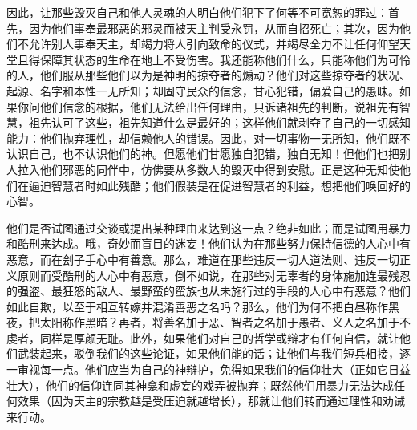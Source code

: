 因此，让那些毁灭自己和他人灵魂的人明白他们犯下了何等不可宽恕的罪过：首先，因为他们事奉最邪恶的邪灵而被天主判受永罚，从而自招死亡；其次，因为他们不允许别人事奉天主，却竭力将人引向致命的仪式，并竭尽全力不让任何仰望天堂且得保障其状态的生命在地上不受伤害。我还能称他们什么，只能称他们为可怜的人，他们服从那些他们以为是神明的掠夺者的煽动？他们对这些掠夺者的状况、起源、名字和本性一无所知；却固守民众的信念，甘心犯错，偏爱自己的愚昧。如果你问他们信念的根据，他们无法给出任何理由，只诉诸祖先的判断，说祖先有智慧，祖先认可了这些，祖先知道什么是最好的；这样他们就剥夺了自己的一切感知能力：他们抛弃理性，却信赖他人的错误。因此，对一切事物一无所知，他们既不认识自己，也不认识他们的神。但愿他们甘愿独自犯错，独自无知！但他们也把别人拉入他们邪恶的同伴中，仿佛要从多数人的毁灭中得到安慰。正是这种无知使他们在逼迫智慧者时如此残酷；他们假装是在促进智慧者的利益，想把他们唤回好的心智。\par

他们是否试图通过交谈或提出某种理由来达到这一点？绝非如此；而是试图用暴力和酷刑来达成。哦，奇妙而盲目的迷妄！他们认为在那些努力保持信德的人心中有恶意，而在刽子手心中有善意。那么，难道在那些违反一切人道法则、违反一切正义原则而受酷刑的人心中有恶意，倒不如说，在那些对无辜者的身体施加连最残忍的强盗、最狂怒的敌人、最野蛮的蛮族也从未施行过的手段的人心中有恶意？他们如此自欺，以至于相互转嫁并混淆善恶之名吗？那么，他们为何不把白昼称作黑夜，把太阳称作黑暗？再者，将善名加于恶、智者之名加于愚者、义人之名加于不虔者，同样是厚颜无耻。此外，如果他们对自己的哲学或辩才有任何自信，就让他们武装起来，驳倒我们的这些论证，如果他们能的话；让他们与我们短兵相接，逐一审视每一点。他们应当为自己的神辩护，免得如果我们的信仰壮大（正如它日益壮大），他们的信仰连同其神龛和虚妄的戏弄被抛弃；既然他们用暴力无法达成任何效果（因为天主的宗教越是受压迫就越增长），那就让他们转而通过理性和劝诫来行动。\par

